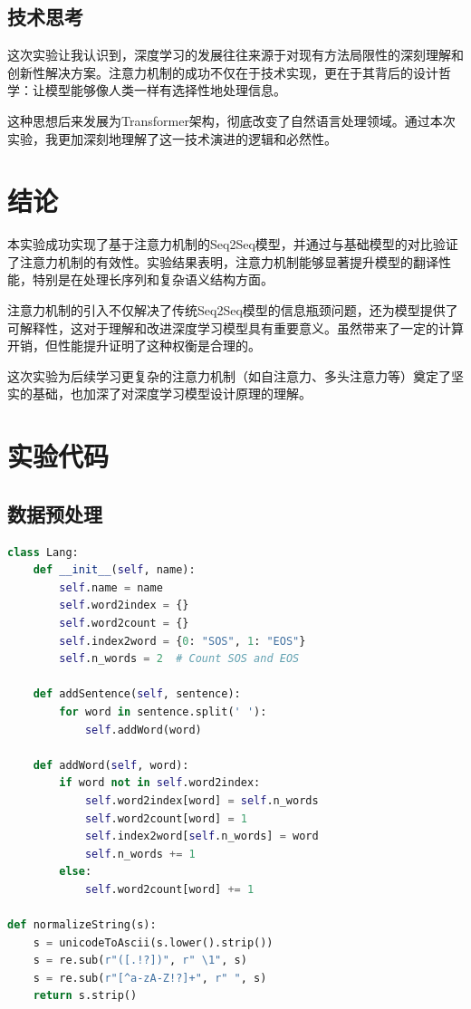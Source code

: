 \documentclass[a4paper]{article}
\begin{document}
\subsection{技术思考}
这次实验让我认识到，深度学习的发展往往来源于对现有方法局限性的深刻理解和创新性解决方案。注意力机制的成功不仅在于技术实现，更在于其背后的设计哲学：让模型能够像人类一样有选择性地处理信息。

这种思想后来发展为Transformer架构，彻底改变了自然语言处理领域。通过本次实验，我更加深刻地理解了这一技术演进的逻辑和必然性。

\section{结论}
本实验成功实现了基于注意力机制的Seq2Seq模型，并通过与基础模型的对比验证了注意力机制的有效性。实验结果表明，注意力机制能够显著提升模型的翻译性能，特别是在处理长序列和复杂语义结构方面。

注意力机制的引入不仅解决了传统Seq2Seq模型的信息瓶颈问题，还为模型提供了可解释性，这对于理解和改进深度学习模型具有重要意义。虽然带来了一定的计算开销，但性能提升证明了这种权衡是合理的。

这次实验为后续学习更复杂的注意力机制（如自注意力、多头注意力等）奠定了坚实的基础，也加深了对深度学习模型设计原理的理解。




\newpage
\appendix
\section{实验代码}
\subsection{数据预处理}
\begin{lstlisting}[language=Python, caption=数据预处理代码]
class Lang:
    def __init__(self, name):
        self.name = name
        self.word2index = {}
        self.word2count = {}
        self.index2word = {0: "SOS", 1: "EOS"}
        self.n_words = 2  # Count SOS and EOS

    def addSentence(self, sentence):
        for word in sentence.split(' '):
            self.addWord(word)

    def addWord(self, word):
        if word not in self.word2index:
            self.word2index[word] = self.n_words
            self.word2count[word] = 1
            self.index2word[self.n_words] = word
            self.n_words += 1
        else:
            self.word2count[word] += 1

def normalizeString(s):
    s = unicodeToAscii(s.lower().strip())
    s = re.sub(r"([.!?])", r" \1", s)
    s = re.sub(r"[^a-zA-Z!?]+", r" ", s)
    return s.strip()
\end{lstlisting}
\end{document}
